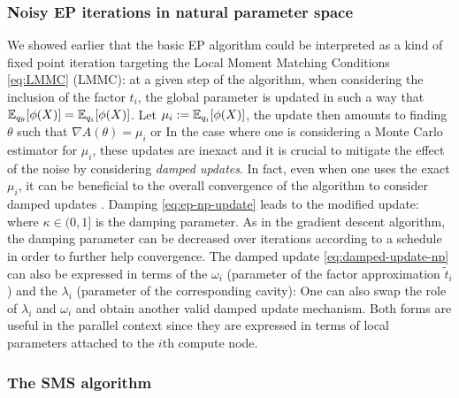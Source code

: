 \subsubsection*{Noisy EP iterations in natural parameter space}
We showed earlier that the basic EP algorithm could be interpreted as a kind of fixed point iteration targeting the Local Moment Matching Conditions \eqref{eq:LMMC} (LMMC): at a given step of the algorithm, when considering the inclusion of the factor $t_i$, the global parameter is updated in such a way that $\mathbb E_{q_\theta}[\phi(X)]= \mathbb E_{q_i}[\phi(X)]$. Let $\mu_i:=\mathbb E_{q_i}[\phi(X)]$, the update then amounts to finding $\theta$ such that $\nabla A(\theta) = \mu_i$ or
%
%
In the case where one is considering a Monte Carlo estimator for $\mu_i$, these updates are inexact and it is crucial to mitigate the effect of the noise by considering \emph{damped updates}. In fact, even when one uses the exact $\mu_i$, it can be beneficial to the overall convergence of the algorithm to consider damped updates \citep{heskes03}. Damping \eqref{eq:ep-np-update} leads to the modified update:
%
%
where $\kappa \in(0,1]$ is the damping parameter. As in the gradient descent algorithm, the damping parameter can be decreased over iterations according to a schedule in order to further help convergence.
The damped update \eqref{eq:damped-update-np} can also be expressed in terms of the $\omega_i$ (parameter of the factor approximation $\tilde t_i$) and the $\lambda_i$ (parameter of the corresponding cavity):
%
%
One can also swap the role of $\lambda_i$ and $\omega_i$ and obtain another valid damped update mechanism. Both forms are useful in the parallel context since they are expressed in terms of local parameters attached to the $i$th compute node.
\subsubsection*{The SMS algorithm}

\subsection{}
